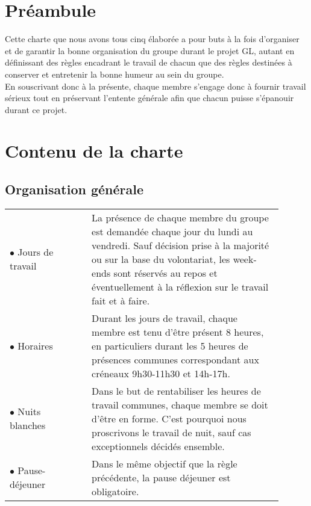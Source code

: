 \documentclass[a4paper,11pt]{article}
\begin{document}
\begin{spacing}{1.3}
		\vspace{-1cm}
		
		\section*{Préambule}

		Cette charte que nous avons tous cinq élaborée a pour buts à la fois d'organiser et de garantir la bonne organisation du groupe durant le projet GL, autant en définissant des règles encadrant le travail de chacun que des règles destinées à conserver et entretenir la bonne humeur au sein du groupe.\\
	
		En souscrivant donc à la présente, chaque membre s'engage donc à fournir travail sérieux tout en préservant l'entente générale afin que chacun puisse s'épanouir durant ce projet.~~\\
		
		
		\section*{Contenu de la charte}
		
		\subsection*{Organisation générale}

		\begin{tabular}{p{0.2\linewidth}  p{0.005\linewidth} p{0.7\linewidth} }
			$\bullet$ Jours de travail & & La présence de chaque membre du groupe est demandée chaque jour du lundi au vendredi. Sauf décision prise à la majorité ou sur la base du volontariat, les week-ends sont réservés au repos et éventuellement à la réflexion sur le travail fait et à faire. \\[0.3cm]
			$\bullet$ Horaires & & Durant les jours de travail, chaque membre est tenu d'être présent 8 heures, en particuliers durant les 5 heures de présences communes correspondant aux créneaux 9h30-11h30 et 14h-17h.\\[0.3cm]
			$\bullet$ Nuits blanches & & Dans le but de rentabiliser les heures de travail communes, chaque membre se doit d'être en forme. C'est pourquoi nous proscrivons le travail de nuit, sauf cas exceptionnels décidés ensemble. \\[0.3cm]
			$\bullet$ Pause-déjeuner & & Dans le même objectif que la règle précédente, la pause déjeuner est obligatoire. \\[0.3cm]
			

\end{tabular}
\end{spacing}
\end{document}
